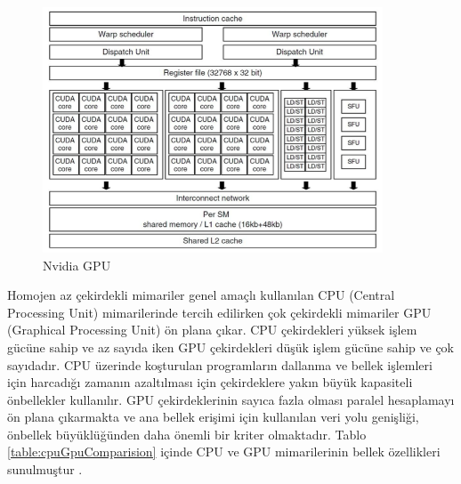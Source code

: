 
\begin{figure}
\centering
\shorthandoff{=}
\includegraphics[width=0.9\textwidth]{gorsel/nvidiagpu.jpg}
\shorthandoff{=}
\caption{Nvidia GPU}
\label{image:nvidiagpu}
\end{figure}



Homojen az çekirdekli mimariler genel amaçlı kullanılan CPU (Central Processing Unit) mimarilerinde tercih edilirken çok çekirdekli mimariler GPU (Graphical Processing Unit) ön plana çıkar. CPU çekirdekleri yüksek işlem gücüne sahip ve az sayıda iken GPU çekirdekleri düşük işlem gücüne sahip ve çok sayıdadır. CPU üzerinde koşturulan programların dallanma ve bellek işlemleri için harcadığı zamanın azaltılması için çekirdeklere yakın büyük kapasiteli önbellekler kullanılır. GPU çekirdeklerinin sayıca fazla olması paralel hesaplamayı ön plana çıkarmakta ve ana bellek erişimi için kullanılan veri yolu genişliği, önbellek büyüklüğünden daha önemli bir kriter olmaktadır. Tablo \ref{table:cpuGpuComparision} içinde CPU ve GPU mimarilerinin bellek özellikleri sunulmuştur \cite{cpuGpuMemoryTable}. \par

